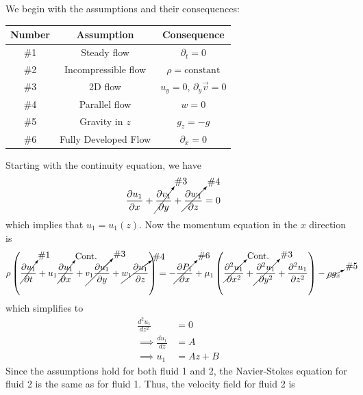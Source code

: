 \subsection{}
We begin with the assumptions and their consequences:
\begin{table}[h]
    \centering
    \begin{tabular}{ccc}
        \toprule
        Number & Assumption & Consequence \\
        \hline
        \#1 & Steady flow & $\partial_t = 0$ \\
        \#2 & Incompressible flow & $\rho = \text{constant}$ \\
        \#3 & 2D flow & $u_y = 0$, $\partial_y \vec{v} = 0$ \\
        \#4 & Parallel flow & $w = 0$ \\
        \#5 & Gravity in $z$ & $g_z = -g$ \\
        \#6 & Fully Developed Flow & $\partial_x = 0$ \\
        \bottomrule
    \end{tabular}
\end{table}
\FloatBarrier
Starting with the continuity equation, we have
\begin{align*}
    \frac{\partial u_1}{\partial x} + \cancelto{\text{\#3}}{\frac{\partial v_1}{\partial y}} + \cancelto{\text{\#4}}{\frac{\partial w_1}{\partial z}} &= 0
\end{align*}
which implies that $u_1 = u_1(z)$. Now the momentum equation in the $x$ direction is
\begin{align*}
    \rho \left(\cancelto{\text{\#1}}{\frac{\partial u_1}{\partial t}} + u_1\cancelto{\text{Cont.}}{\frac{\partial u_1}{\partial x}} + \cancelto{\text{\#3}}{v_1 \frac{\partial u_1}{\partial y}} + \cancelto{\text{\#4}}{w_1 \frac{\partial u_1}{\partial z}}\right) &= -\cancelto{\text{\#6}}{\frac{\partial P_1}{\partial x}} + \mu_1 \left(\cancelto{\text{Cont.}}{\frac{\partial^2 u_1}{\partial x^2}} + \cancelto{\text{\#3}}{\frac{\partial^2 u_1}{\partial y^2}} + \frac{\partial^2 u_1}{\partial z^2}\right) - \cancelto{\text{\#5}}{\rho g_x}
\end{align*}
which simplifies to
\begin{align*}
    \frac{d^2 u_1}{dz^2} &= 0 \\
    \implies \frac{du_1}{dz} &= A \\
    \implies u_1 &= A z + B
\end{align*}
Since the assumptions hold for both fluid 1 and 2, the Navier-Stokes equation for fluid 2 is the same as for fluid 1. Thus, the velocity field for fluid 2 is
